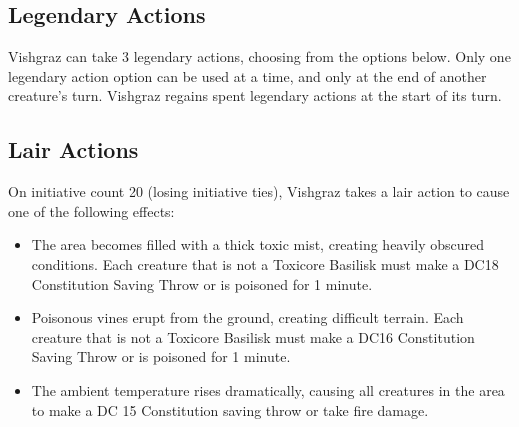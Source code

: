 \subsection*{Legendary Actions}
Vishgraz can take 3 legendary actions, choosing from the options below. Only one legendary action option can be used at a time, and only at the end of another creature's turn. Vishgraz regains spent legendary actions at the start of its turn.
\begin{DndMonsterLegendaryActions}
\end{DndMonsterLegendaryActions}

\subsection*{Lair Actions}
On initiative count 20 (losing initiative ties), Vishgraz takes a lair action to cause one of the following effects:
\begin{itemize}
	\item The area becomes filled with a thick toxic mist, creating heavily obscured conditions. Each creature that is not a Toxicore Basilisk must make a DC18 Constitution Saving Throw or is poisoned for 1 minute.
	\item Poisonous vines erupt from the ground, creating difficult terrain. Each creature that is not a Toxicore Basilisk must make a DC16 Constitution Saving Throw or is poisoned for 1 minute.
	\item  The ambient temperature rises dramatically, causing all creatures in the area to make a DC 15 Constitution saving throw or take  fire damage.
\end{itemize}

